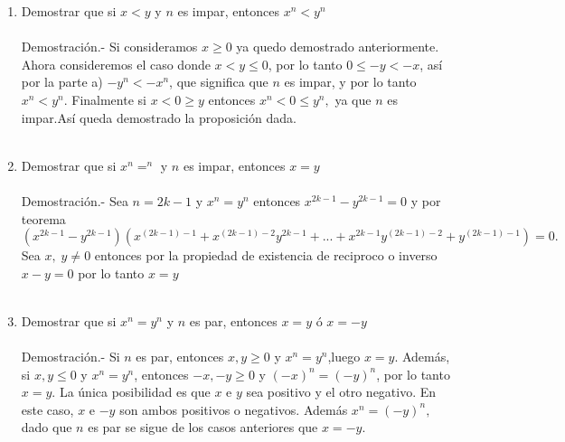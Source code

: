 \begin{enumerate}[\bfseries 1.]
\begin{enumerate}[\bfseries a)]
\item Demostrar que si $x<y$ y $n$ es impar, entonces $x^n<y^n$\\\\
Demostración.- \; Si consideramos  $x\geq 0$ ya quedo demostrado anteriormente. Ahora consideremos el caso donde $x<y\leq 0$, por lo tanto $0\leq -y<-x$, así por la parte a) $-y^n < -x^n$, que significa que $n$ es impar, y por lo tanto $x^n < y^n$. Finalmente si $x<0\geq y$ entonces $x^n < 0 \leq y^n,$ ya que $n$ es impar.Así queda demostrado la proposición dada.\\\\

\item Demostrar que si $x^n=  ^n$ y $n$ es impar, entonces $x=y$\\\\
Demostración.- \;
Sea $n=2k-1$ y $x^n=y^n$ entonces $x^{2k-1}-y^{2k-1}=0$ y por teorema \; $(x^{2k-1}-y^{2k-1})(x^{(2k-1)-1}+x^{(2k-1)-2}y^{2k-1}+...+x^{2k-1}y^{(2k-1)-2}+y^{(2k-1)-1})=0.$ Sea $x, \; y \neq 0$ entonces por la propiedad de existencia de reciproco o inverso \, $x-y=0$ por lo tanto $x=y$\\\\

\item Demostrar que si $x^n=y^n$ y $n$ es par, entonces $x=y$ ó $x=-y$\\\\
Demostración.- \; Si $n$ es par, entonces $x,y\geq 0$ y $x^n=y^n$,luego $x=y$. Además, si $x,y\leq 0$ y $x^n=y^n$, entonces $-x,-y\geq 0$ y $(-x)^n=(-y)^n$, por lo tanto $x=y$. La única posibilidad es que $x$ e $y$ sea positivo y el otro negativo. En este caso, $x$ e $-y$ son ambos positivos o negativos. Además $x^n=(-y)^n,$ dado que $n$ es par se sigue de los casos anteriores que $x=-y$.\\\\
\end{enumerate}


\end{enumerate}
